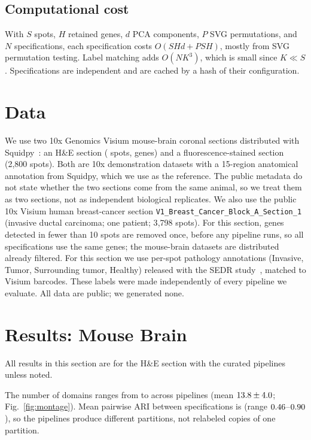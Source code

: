 \documentclass[conference]{IEEEtran}
\begin{document}
\subsection{Computational cost}
With $S$ spots, $H$ retained genes, $d$ PCA components, $P$ SVG
permutations, and $N$ specifications, each specification costs
$O(SHd + PSH)$, mostly from SVG permutation testing. Label matching adds
$O(NK^3)$, which is small since $K\ll S$. Specifications are independent
and are cached by a hash of their configuration.

\section{Data}
We use two 10x Genomics Visium mouse-brain coronal sections distributed with
Squidpy~\cite{palla2022squidpy}: an H\&E section (\Nspots{} spots, \Ngenes{}
genes) and a fluorescence-stained section (2{,}800 spots). Both are 10x
demonstration datasets with a 15-region anatomical annotation from Squidpy,
which we use as the reference. The public metadata do not state whether
the two sections come from the same animal, so we treat them as two
sections, not as independent biological replicates. We also use the public
10x Visium human breast-cancer section
\texttt{V1\_Breast\_Cancer\_Block\_A\_Section\_1} (invasive ductal
carcinoma; one patient; 3{,}798 spots). For this section, genes detected in
fewer than 10 spots are removed once, before any pipeline runs, so all
specifications use the same genes; the mouse-brain datasets are distributed
already filtered. For this section we use per-spot pathology annotations
(Invasive, Tumor, Surrounding tumor, Healthy) released with the SEDR
study~\cite{fu2021sedr}, matched to Visium barcodes. These labels were made
independently of every pipeline we evaluate. All data are public; we
generated none.

\section{Results: Mouse Brain}
\label{sec:results}

All results in this section are for the H\&E section with the curated
pipelines unless noted.

The number of domains ranges from
\ClustMin{} to \ClustMax{} across pipelines (mean
$13.8{}\pm4.0{}$; Fig.~\ref{fig:montage}). Mean pairwise ARI
between specifications is \AriMean{} (range $0.46{}$--$0.90{}$), so
the pipelines produce different partitions, not relabeled copies of one
partition.
\end{document}
